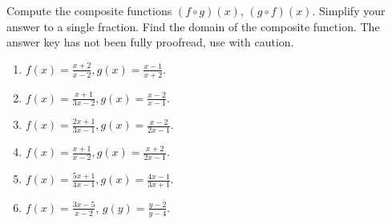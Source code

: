 Compute the composite functions $(f\circ g)(x)$, $(g\circ f)(x)$. Simplify your answer to a single fraction. Find the domain of the composite function. The answer key has not been fully proofread, use with caution. 

\begin{enumerate}[ref={\fcProblemRef}]
\item $\displaystyle f{}({{x}})=\frac{x+2}{x-2},
g{}({{x}})=\frac{x-1}{x+2}$.

\item 
$\displaystyle f{}({{x}})=\frac{x+1}{3x-2}, g{}({{x}})= \frac{x-2}{x-1}
$.

\item 
$\displaystyle f{}({{x}})=\frac{2x+1}{3x-1},
g{}({{x}})=\frac{x-2}{2x-1}
$.

\item 
$\displaystyle f{}({{x}})=\frac{x+1}{x-2},
g{}({{x}})=\frac{x+2}{2x-1}
$.

\item 
$\displaystyle f{}({{x}})=\frac{5x+1}{4x-1},
g{}({{x}})=\frac{4x-1}{3x+1}
$.

\item $\displaystyle  f(x)= \frac{3x-5}{x-2}$, $\displaystyle g(y)=\frac{y-2 }{y-4} $. 


\end{enumerate}
